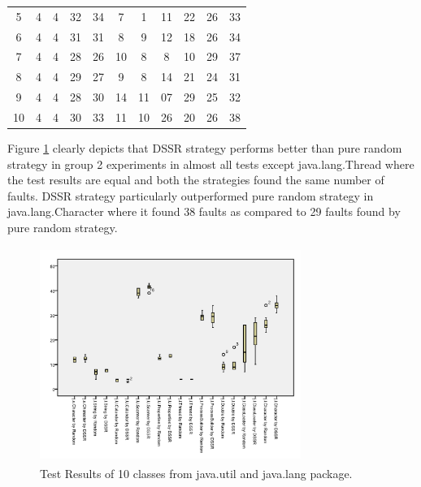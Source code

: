 \documentclass[10pt, conference, compsocconf]{IEEEtran}
\begin{document}
\begin{table}[ht]
\begin{tabular}{| c | c | c | c | c | c | c | c | c | c | c |}
5 & 4 & 4 & 32 & 34 & 7 & 1 & 11 & 22 & 26 & 33\\

6 & 4 & 4 & 31 & 31 & 8 & 9 & 12 & 18 & 26 & 34\\

7 & 4 & 4 & 28 & 26 & 10 & 8 & 8 & 10 & 29 & 37\\

8 & 4 & 4 & 29 & 27 & 9 & 8 & 14 & 21 & 24 & 31\\

9 & 4 & 4 & 28 & 30 & 14 & 11 & 07 & 29 & 25 & 32\\ 

10 & 4 & 4 & 30 & 33 & 11 & 10 & 26 & 20 & 26 & 38\\ [1ex] %

\hline %
\end{tabular}
\label{table:tenb} %
\end{table}

\newpage

Figure \ref{fig:Result2} clearly depicts that DSSR strategy performs better than pure random strategy in group 2 experiments in almost all tests except java.lang.Thread where the test results are equal and both the strategies found the same number of faults. DSSR strategy particularly outperformed pure random strategy in java.lang.Character where it found 38 faults as compared to 29 faults found by pure random strategy.\\

\begin{figure}[htp]
\centering
\includegraphics[width=8.5cm,height=7cm]{javatests.png}
\caption{Test Results of 10 classes from java.util and java.lang package.}
\label{fig:Result2}
\end{figure}
\end{document}
